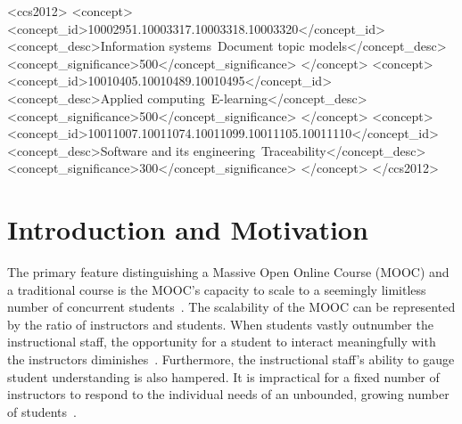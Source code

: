 \documentclass[sigconf, anonymous]{acmart}
\begin{document}
\begin{CCSXML}
<ccs2012>
<concept>
<concept_id>10002951.10003317.10003318.10003320</concept_id>
<concept_desc>Information systems~Document topic models</concept_desc>
<concept_significance>500</concept_significance>
</concept>
<concept>
<concept_id>10010405.10010489.10010495</concept_id>
<concept_desc>Applied computing~E-learning</concept_desc>
<concept_significance>500</concept_significance>
</concept>
<concept>
<concept_id>10011007.10011074.10011099.10011105.10011110</concept_id>
<concept_desc>Software and its engineering~Traceability</concept_desc>
<concept_significance>300</concept_significance>
</concept>
</ccs2012>
\end{CCSXML}



\maketitle

\section{Introduction and Motivation}
The primary feature distinguishing a Massive Open Online Course (MOOC) and a traditional course is the MOOC's capacity to scale to a seemingly limitless number of concurrent students~\cite{pappano2012year}.
The scalability of the MOOC can be represented by the ratio of instructors and students.
When students vastly outnumber the instructional staff, the opportunity for a student to interact meaningfully with the instructors diminishes~\cite{huang2014superposter}.
Furthermore, the instructional staff's ability to gauge student understanding is also hampered.
It is impractical for a fixed number of instructors to respond to the individual needs of an unbounded, growing number of students~\cite{mackness2010ideals}.
\end{document}
